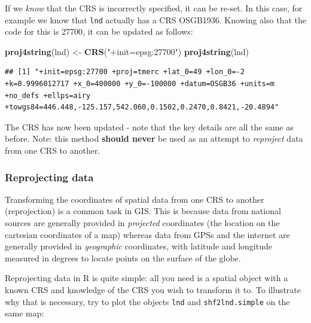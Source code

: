 \documentclass[]{article}
\newenvironment{Shaded}{}{}
\newcommand{\KeywordTok}[1]{\textcolor[rgb]{0.00,0.44,0.13}{\textbf{{#1}}}}
\newcommand{\StringTok}[1]{\textcolor[rgb]{0.25,0.44,0.63}{{#1}}}
\newcommand{\NormalTok}[1]{{#1}}
\begin{document}
If we \emph{know} that the CRS is incorrectly specified, it can be
re-set. In this case, for example we know that \texttt{lnd} actually has
a CRS OSGB1936. Knowing also that the code for this is 27700, it can be
updated as follows:

\begin{Shaded}
\begin{Highlighting}[]
\KeywordTok{proj4string}\NormalTok{(lnd) <- }\KeywordTok{CRS}\NormalTok{(}\StringTok{"+init=epsg:27700"}\NormalTok{)}
\KeywordTok{proj4string}\NormalTok{(lnd)}
\end{Highlighting}
\end{Shaded}
\begin{verbatim}
## [1] "+init=epsg:27700 +proj=tmerc +lat_0=49 +lon_0=-2 +k=0.9996012717 +x_0=400000 +y_0=-100000 +datum=OSGB36 +units=m +no_defs +ellps=airy +towgs84=446.448,-125.157,542.060,0.1502,0.2470,0.8421,-20.4894"
\end{verbatim}
The CRS has now been updated - note that the key details are all the
same as before. Note: this method \textbf{should never} be used as an
attempt to \emph{reproject} data from one CRS to another.

\subsubsection{Reprojecting data}

Transforming the coordinates of spatial data from one CRS to another
(reprojection) is a common task in GIS. This is because data from
national sources are generally provided in \emph{projected} coordinates
(the location on the cartesian coordinates of a map) whereas data from
GPSs and the internet are generally provided in \emph{geographic}
coordinates, with latitude and longitude measured in degrees to locate
points on the surface of the globe.

Reprojecting data in R is quite simple: all you need is a spatial object
with a known CRS and knowledge of the CRS you wish to transform it to.
To illustrate why that is necessary, try to plot the objects
\texttt{lnd} and \texttt{shf2lnd.simple} on the same map:
\end{document}
